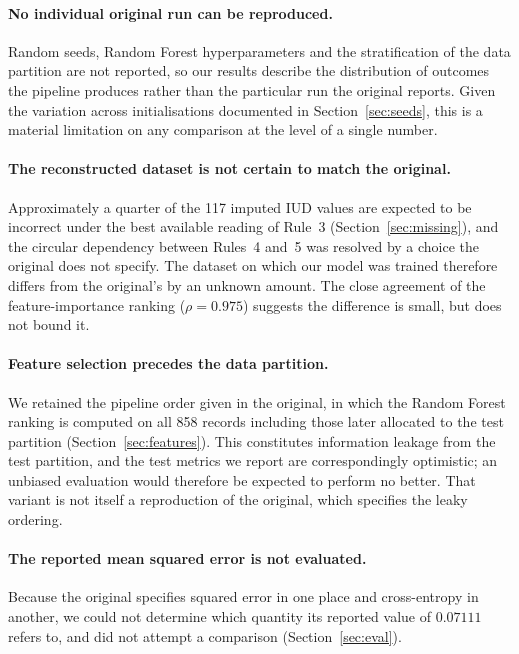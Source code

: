 \paragraph{No individual original run can be reproduced.} Random seeds, Random
Forest hyperparameters and the stratification of the data partition are not
reported, so our results describe the distribution of outcomes the pipeline
produces rather than the particular run the original reports. Given the
variation across initialisations documented in Section~\ref{sec:seeds}, this is
a material limitation on any comparison at the level of a single number.

\paragraph{The reconstructed dataset is not certain to match the original.}
Approximately a quarter of the 117 imputed IUD values are expected to be
incorrect under the best available reading of Rule~3
(Section~\ref{sec:missing}), and the circular dependency between Rules~4 and~5
was resolved by a choice the original does not specify. The dataset on which
our model was trained therefore differs from the original's by an unknown
amount. The close agreement of the feature-importance ranking
($\rho = 0.975$) suggests the difference is small, but does not bound it.

\paragraph{Feature selection precedes the data partition.} We retained the
pipeline order given in the original, in which the Random Forest ranking is
computed on all 858 records including those later allocated to the test
partition (Section~\ref{sec:features}). This constitutes information leakage
from the test partition, and the test metrics we report are correspondingly
optimistic; an unbiased evaluation would therefore be expected to perform no
better. That variant is not itself a reproduction of the original, which
specifies the leaky ordering.

\paragraph{The reported mean squared error is not evaluated.} Because the
original specifies squared error in one place and cross-entropy in another, we
could not determine which quantity its reported value of $0.07111$ refers to,
and did not attempt a comparison (Section~\ref{sec:eval}).

